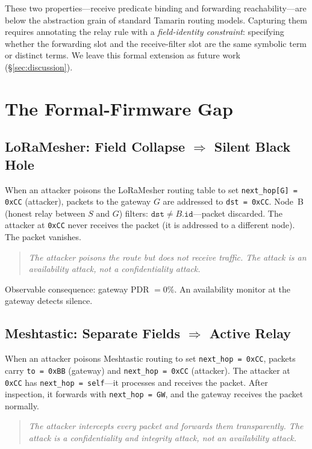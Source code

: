 \documentclass[journal]{IEEEtran}
\begin{document}
These two properties---receive predicate binding and forwarding
reachability---are below the abstraction grain of standard Tamarin routing
models. Capturing them requires annotating the relay rule with a
\emph{field-identity constraint}: specifying whether the forwarding slot
and the receive-filter slot are the same symbolic term or distinct terms.
We leave this formal extension as future work (§\ref{sec:discussion}).

\section{The Formal-Firmware Gap}
\label{sec:gap}

\subsection{LoRaMesher: Field Collapse $\Rightarrow$ Silent Black Hole}

When an attacker poisons the LoRaMesher routing table to set
\texttt{next\_hop[G] = 0xCC} (attacker), packets to the gateway $G$ are
addressed to \texttt{dst = 0xCC}. Node~B (honest relay between $S$ and $G$)
filters: $\texttt{dst} \neq B.\texttt{id}$---packet discarded. The attacker
at \texttt{0xCC} never receives the packet (it is addressed to a different
node). The packet vanishes.

\begin{quote}
\textit{The attacker poisons the route but does not receive traffic.
The attack is an availability attack, not a confidentiality attack.}
\end{quote}

Observable consequence: gateway PDR $= 0$\%. An availability monitor at the
gateway detects silence.

\subsection{Meshtastic: Separate Fields $\Rightarrow$ Active Relay}

When an attacker poisons Meshtastic routing to set
\texttt{next\_hop = 0xCC}, packets carry \texttt{to = 0xBB} (gateway) and
\texttt{next\_hop = 0xCC} (attacker). The attacker at \texttt{0xCC} has
\texttt{next\_hop = self}---it processes and receives the packet. After
inspection, it forwards with \texttt{next\_hop = GW}, and the gateway
receives the packet normally.

\begin{quote}
\textit{The attacker intercepts every packet and forwards them transparently.
The attack is a confidentiality and integrity attack, not an availability attack.}
\end{quote}
\end{document}
